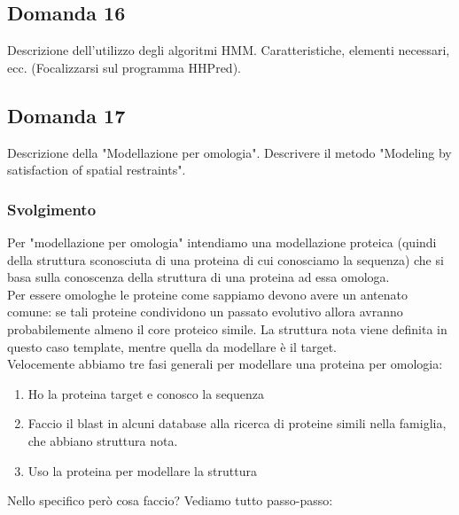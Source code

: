 \documentclass{article}
\begin{document}
\subsection*{Domanda 16}
Descrizione dell'utilizzo degli algoritmi HMM. Caratteristiche, elementi necessari, ecc. (Focalizzarsi sul programma HHPred).

\subsection*{Domanda 17}
Descrizione della "Modellazione per omologia". Descrivere il metodo "Modeling by satisfaction of spatial restraints".

\subsubsection*{Svolgimento}
Per "modellazione per omologia" intendiamo una modellazione proteica (quindi della struttura sconosciuta di una proteina di cui conosciamo la sequenza) che si basa sulla conoscenza della struttura di una proteina ad essa omologa.\\
Per essere omologhe le proteine come sappiamo devono avere un antenato comune: se tali proteine condividono un passato evolutivo allora avranno probabilemente almeno il core proteico simile. La struttura nota viene definita in questo caso template, mentre quella da modellare è il target.\\
Velocemente abbiamo tre fasi generali per modellare una proteina per omologia:
\begin{enumerate}
    \item Ho la proteina target e conosco la sequenza
    \item Faccio il blast in alcuni database alla ricerca di proteine simili nella famiglia, che abbiano struttura nota.
    \item Uso la proteina per modellare la struttura
\end{enumerate}
Nello specifico però cosa faccio? Vediamo tutto passo-passo:
\end{document}
